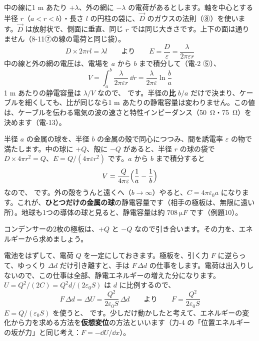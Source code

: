 \noindent 中の線に1 m あたり $+\lambda$、外の網に $-\lambda$ の電荷があるとします。軸を中心とする半径 $r$（$a<r<b$）・長さ $l$ の円柱の袋に、$\vec D$ のガウスの法則（⑧）を使います。$\vec D$ は放射状で、側面に垂直、同じ $r$ では同じ大きさです。上下の面は通りません（8-11⑦の線の電荷と同じ袋）。
\[D\times2\pi rl=\lambda l\qquad\text{より}\qquad E=\frac{D}{\varepsilon}=\frac{\lambda}{2\pi\varepsilon r}\]
中の線と外の網の電圧は、電場を $a$ から $b$ まで積分して（電-2 ⑤）、
\[V=\int_a^b\frac{\lambda}{2\pi\varepsilon r}\,\dd r=\frac{\lambda}{2\pi\varepsilon}\ln\frac{b}{a}\]
1 m あたりの静電容量は $\lambda/V$ なので、
\label{ph:電-3:doujiku}です。半径の\textbf{比} $b/a$ だけで決まり、ケーブルを細くしても、比が同じなら1 m あたりの静電容量は変わりません。この値は、ケーブルを伝わる電気の波の速さと特性インピーダンス（\qty{50}{\ohm}・\qty{75}{\ohm}）を決めます（電-13）。

半径 $a$ の金属の球を、半径 $b$ の金属の殻で同心につつみ、間を誘電率 $\varepsilon$ の物で満たします。中の球に $+Q$、殻に $-Q$ があると、半径 $r$ の球の袋で $D\times4\pi r^2=Q$、$E=Q/(4\pi\varepsilon r^2)$ です。$a$ から $b$ まで積分すると
\[V=\frac{Q}{4\pi\varepsilon}\Bigl(\frac1a-\frac1b\Bigr)\]
なので、
です。外の殻をうんと遠くへ（$b\to\infty$）やると、$C=4\pi\varepsilon_0a$ になります。これが、\textbf{ひとつだけの金属の球}の静電容量です（相手の極板は、無限に遠い所）。地球も1つの導体の球と見ると、静電容量は約 $\qty{708}{\micro F}$ です（例題10）。

\label{ph:電-3:sec11}
コンデンサーの2枚の極板は、$+Q$ と $-Q$ なので引き合います。その力を、エネルギーから求めましょう。

電池をはずして、電荷 $Q$ を一定にしておきます。極板を、引く力 $F$ に逆らって、ゆっくり $\Delta d$ だけ引き離すと、手は $F\,\Delta d$ の仕事をします。電荷は出入りしないので、この仕事は全部、静電エネルギーの増えた分になります。$U=Q^2/(2C)=Q^2d/(2\varepsilon_0S)$ は $d$ に比例するので、
\[F\,\Delta d=\Delta U=\frac{Q^2}{2\varepsilon_0S}\,\Delta d\qquad\text{より}\qquad F=\frac{Q^2}{2\varepsilon_0S}\]
$E=Q/(\varepsilon_0S)$ を使うと、
\label{ph:電-3:inryoku}です。少しだけ動かしたと考えて、エネルギーの変化から力を求める方法を\textbf{仮想変位}の方法といいます（力-4 の「位置エネルギーの坂が力」と同じ考え：$F=-\dd U/\dd x$）。

